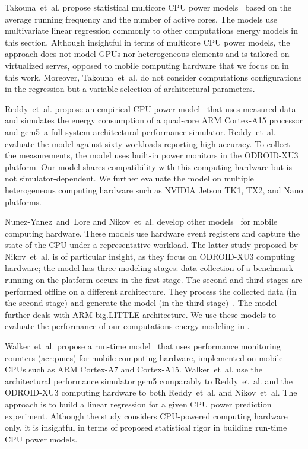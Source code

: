Takouna~et~al. propose statistical multicore CPU power models~\citep{takouna2011accurate} based on the average running frequency and the number of active cores. The models use multivariate linear regression commonly to other computations energy models in this section. Although insightful in terms of multicore CPU power models, the approach does not model GPUs nor heterogeneous elements and is tailored on virtualized serves, opposed to mobile computing hardware that we focus on in this work. Moreover, Takouna~et~al. do not consider computations configurations in the regression but a variable selection of architectural parameters.

Reddy~et~al. propose an empirical CPU power model~\citep{reddy2017empirical} that uses measured data and simulates the energy consumption of a quad-core ARM Cortex-A15 processor and gem5--a full-system architectural performance simulator. Reddy~et~al. evaluate the model against sixty workloads reporting high accuracy. To collect the measurements, the model uses built-in power monitors in the ODROID-XU3 platform. Our model shares compatibility with this computing hardware but is not simulator-dependent. We further evaluate the model on multiple heterogeneous computing hardware such as NVIDIA Jetson TK1, TX2, and Nano platforms.

Nunez-Yanez~and~Lore and Nikov~et~al. develop other models~\citep{nunez2013enabling,nikov2015evaluation} for mobile computing hardware. These models use hardware event registers and capture the state of the CPU under a representative workload. The latter study proposed by Nikov~et~al. is of particular insight, as they focus on ODROID-XU3 computing hardware; the model has three modeling stages: data collection of a benchmark running on the platform occurs in the first stage. The second and third stages are performed offline on a different architecture. They process the collected data (in the second stage) and generate the model (in the third stage)~\citep{seewald2019coarse}. The model further deals with ARM big.LITTLE architecture. We use these models to evaluate the performance of our computations energy modeling in .

Walker~et~al. propose a run-time model~\citep{walker2017accurate} that uses performance monitoring counters (\Gls{acr:pmc}s) for mobile computing hardware, implemented on mobile CPUs such as ARM Cortex-A7 and Cortex-A15. Walker~et~al. use the architectural performance simulator gem5 comparably to Reddy~et~al. and the ODROID-XU3 computing hardware to both Reddy~et~al. and Nikov~et~al. The approach is to build a linear regression for a given CPU power prediction experiment. Although the study considers CPU-powered computing hardware only, it is insightful in terms of proposed statistical rigor in building run-time CPU power models.


